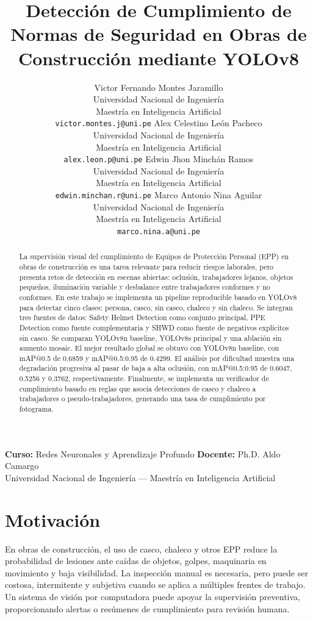 \documentclass{article}
\title{Detección de Cumplimiento de Normas de Seguridad en Obras de Construcción mediante YOLOv8}
\author{%
  Victor Fernando Montes Jaramillo \\
  Universidad Nacional de Ingeniería \\
  Maestría en Inteligencia Artificial \\
  \texttt{victor.montes.j@uni.pe}
  \And
  Alex Celestino León Pacheco \\
  Universidad Nacional de Ingeniería \\
  Maestría en Inteligencia Artificial \\
  \texttt{alex.leon.p@uni.pe}
  \And
  Edwin Jhon Minchán Ramos \\
  Universidad Nacional de Ingeniería \\
  Maestría en Inteligencia Artificial \\
  \texttt{edwin.minchan.r@uni.pe}
  \AND
  Marco Antonio Nina Aguilar \\
  Universidad Nacional de Ingeniería \\
  Maestría en Inteligencia Artificial \\
  \texttt{marco.nina.a@uni.pe}
}
\begin{document}
\maketitle

\begin{center}
  \small
  \textbf{Curso:} Redes Neuronales y Aprendizaje Profundo \quad
  \textbf{Docente:} Ph.D. Aldo Camargo \\
  Universidad Nacional de Ingeniería --- Maestría en Inteligencia Artificial
\end{center}
\vspace{0.5em}

\begin{abstract}
La supervisión visual del cumplimiento de Equipos de Protección Personal (EPP) en obras de construcción es una tarea relevante para reducir riesgos laborales, pero presenta retos de detección en escenas abiertas: oclusión, trabajadores lejanos, objetos pequeños, iluminación variable y desbalance entre trabajadores conformes y no conformes. En este trabajo se implementa un pipeline reproducible basado en YOLOv8 para detectar cinco clases: persona, casco, sin casco, chaleco y sin chaleco. Se integran tres fuentes de datos: Safety Helmet Detection como conjunto principal, PPE Detection como fuente complementaria y SHWD como fuente de negativos explícitos sin casco. Se comparan YOLOv8n baseline, YOLOv8s principal y una ablación sin aumento mosaic. El mejor resultado global se obtuvo con YOLOv8n baseline, con mAP@0.5 de 0.6859 y mAP@0.5:0.95 de 0.4299. El análisis por dificultad muestra una degradación progresiva al pasar de baja a alta oclusión, con mAP@0.5:0.95 de 0.6047, 0.5256 y 0.3762, respectivamente. Finalmente, se implementa un verificador de cumplimiento basado en reglas que asocia detecciones de casco y chaleco a trabajadores o pseudo-trabajadores, generando una tasa de cumplimiento por fotograma.
\end{abstract}

\section{Motivación}
En obras de construcción, el uso de casco, chaleco y otros EPP reduce la probabilidad de lesiones ante caídas de objetos, golpes, maquinaria en movimiento y baja visibilidad. La inspección manual es necesaria, pero puede ser costosa, intermitente y subjetiva cuando se aplica a múltiples frentes de trabajo. Un sistema de visión por computadora puede apoyar la supervisión preventiva, proporcionando alertas o resúmenes de cumplimiento para revisión humana.
\end{document}
